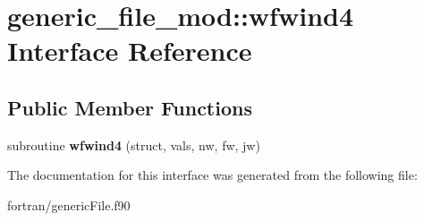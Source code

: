 \hypertarget{interfacegeneric__file__mod_1_1wfwind4}{}\section{generic\+\_\+file\+\_\+mod\+:\+:wfwind4 Interface Reference}
\label{interfacegeneric__file__mod_1_1wfwind4}
\subsection*{Public Member Functions}
\begin{DoxyCompactItemize}
\item 
\mbox{\label{interfacegeneric__file__mod_1_1wfwind4_a439e03be4cdca154eea2413a573a0b93}} 
subroutine {\bfseries wfwind4} (struct, vals, nw, fw, jw)
\end{DoxyCompactItemize}


The documentation for this interface was generated from the following file\+:\begin{DoxyCompactItemize}
\item 
fortran/generic\+File.\+f90\end{DoxyCompactItemize}

